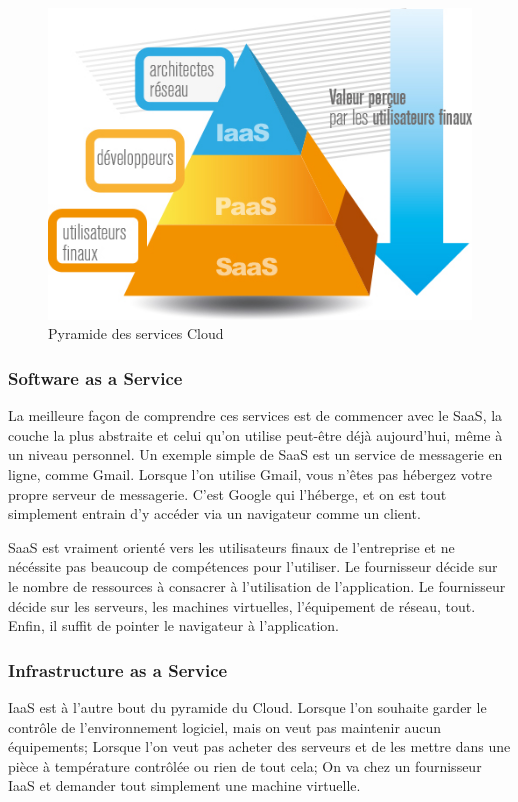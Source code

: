\begin{onehalfspace}
\begin{figure}[H]
\centering
\includegraphics [scale=0.7]{chapitre2/assets/pyramide.jpg}
\caption{Pyramide des services Cloud}
\end{figure}

\subsubsection*{Software as a Service}

La meilleure façon de comprendre ces services est de commencer avec le SaaS, la couche la plus abstraite et celui qu'on utilise peut-être déjà aujourd'hui, même à un niveau personnel. Un exemple simple de SaaS est un service de messagerie en ligne, comme Gmail. Lorsque l'on utilise Gmail, vous n'êtes pas hébergez votre propre serveur de messagerie. C'est Google qui l'héberge, et on est tout simplement entrain d'y accéder via un navigateur comme un client.

SaaS est vraiment orienté vers les utilisateurs finaux de l'entreprise et ne nécéssite pas beaucoup de compétences pour l'utiliser. Le fournisseur décide sur le nombre de ressources à consacrer à l'utilisation de l'application. Le fournisseur décide sur les serveurs, les machines virtuelles, l'équipement de réseau, tout. Enfin, il suffit de pointer le navigateur à l'application.

\subsubsection*{Infrastructure as a Service}

IaaS est à l'autre bout du pyramide du Cloud. Lorsque l'on souhaite garder le contrôle de l'environnement logiciel, mais on veut pas maintenir aucun équipements; Lorsque l'on veut pas acheter des serveurs et de les mettre dans une pièce à température contrôlée ou rien de tout cela; On va chez un fournisseur IaaS et demander tout simplement une machine virtuelle.


\end{onehalfspace}
